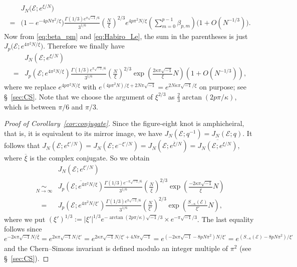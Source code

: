 \documentclass[a4paper,dvipdfmx]{amsart}
\theoremstyle{plain}
\theoremstyle{definition}
\theoremstyle{remark}
\newcommand{\FE}{\mathscr{E}}
\renewcommand{\i}{\sqrt{-1}}
\numberwithin{equation}{section}
\begin{document}
\begin{equation}
\begin{split}
  &J_N\bigl(\FE;e^{\xi/N}\bigr)
  \\
  =&
  \bigl(1-e^{-4pN\pi^2/\xi}\bigr)
  \frac{\Gamma(1/3)e^{\pi\i/6}}{3^{1/6}}
  \left(\frac{N}{\xi}\right)^{2/3}
  e^{4p\pi^2N/\xi}
  \left(\sum_{m=0}^{p-1}\beta_{p,m}\right)
  \bigl(1+O(N^{-1/3})\bigr).
\end{split}
\end{equation}
Now from \eqref{eq:beta_pm} and \eqref{eq:Habiro_Le}, the sum in the parentheses is just $J_{p}\bigl(\FE;e^{4\pi^2N/\xi}\bigr)$.
Therefore we finally have
\begin{align*}
  &J_N\left(\FE;e^{\xi/N}\right)
  \\
  =&
  J_p\left(\FE;e^{4\pi^2N/\xi}\right)
  \frac{\Gamma(1/3)e^{\pi\i/6}}{3^{1/6}}
  \left(\frac{N}{\xi}\right)^{2/3}\exp\left(\frac{2\kappa\pi\i}{\xi}N\right)
  \left(1+O(N^{-1/3})\right),
\end{align*}
where we replace $e^{4p\pi^2N/\xi}$ with $e^{(4p\pi^2N)/\xi+2N\pi\i}=e^{2N\kappa\pi\i/\xi}$ on purpose; see \S~\ref{sec:CS}.
Note that we choose the argument of $\xi^{2/3}$ as $\frac{2}{3}\arctan(2p\pi/\kappa)$, which is between $\pi/6$ and $\pi/3$.
\begin{proof}[Proof of Corollary~\ref{cor:conjugate}]
Since the figure-eight knot is amphicheiral, that is, it is equivalent to its mirror image, we have $J_N(\FE;q^{-1})=J_N(\FE;q)$.
It follows that $J_N\left(\FE;e^{\xi'/N}\right)=J_N\left(\FE;e^{-\xi'/N}\right)=J_N\left(\FE;e^{\overline{\xi}/N}\right)=\overline{J_N\left(\FE;e^{\xi/N}\right)}$, where $\overline{\xi}$ is the complex conjugate.
So we obtain
\begin{equation*}
\begin{split}
  &J_N\left(\FE;e^{\xi'/N}\right)
  \\
  \underset{N\to\infty}{\sim}&
  \overline{J_p\left(\FE;e^{4\pi^2N/\xi}\right)}
  \frac{\Gamma(1/3)e^{-\pi\i/6}}{3^{1/6}}
  \left(\frac{N}{\overline{\xi}}\right)^{2/3}
  \exp\left(\frac{-2\kappa\pi\i}{\overline{\xi}}N\right)
  \\
  \underset{\phantom{N\to\infty}}{=}&
  J_p\left(\FE;e^{4\pi^2N/\xi'}\right)
  \frac{\Gamma(1/3)e^{\pi\i/6}}{3^{1/6}}
  \left(\frac{N}{\xi'}\right)^{2/3}
  \exp\left(\frac{S_{-\kappa}(\FE)}{\xi'}N\right),
\end{split}
\end{equation*}
where we put $(\xi')^{1/3}:=|\xi'|^{1/3}e^{-\arctan(2p\pi/\kappa)\i/3}\times e^{-\pi\i/3}$.
The last equality follows since $e^{-2\kappa\pi\i N/\overline{\xi}}=e^{2\kappa\pi\i N/\xi'}=e^{2\kappa\pi\i N/\xi'+4N\pi\i}=e^{(-2\kappa\pi\i-8pN\pi^2)N/\xi'}=e^{(S_{-\kappa}(\FE)-8pN\pi^2)/\xi'}$ and the Chern--Simons invariant is defined modulo an integer multiple of $\pi^2$ (see \S~\ref{sec:CS}).
\end{proof}
\end{document}
